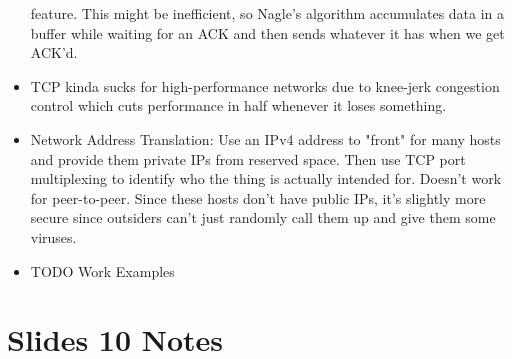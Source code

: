 \documentclass{scrartcl}
\begin{document}
\begin{itemize}
feature. This might be inefficient, so Nagle's algorithm accumulates data
in a buffer while waiting for an ACK and then sends whatever it has when
we get ACK'd.
\item TCP kinda sucks for high-performance networks due to knee-jerk
congestion control which cuts performance in half whenever it loses
something.
\item Network Address Translation: Use an IPv4 address to "front" for
many hosts and provide them private IPs from reserved space.
Then use TCP port multiplexing to identify who the thing is actually
intended for. Doesn't work for peer-to-peer. Since these hosts don't 
have public IPs, it's slightly more secure since outsiders can't just
randomly call them up and give them some viruses.
\item TODO Work Examples
\end{itemize}
\section*{Slides 10 Notes}
\end{document}
